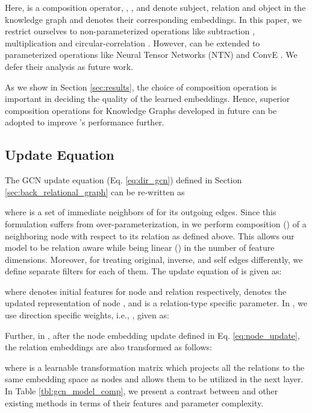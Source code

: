 \documentclass{article} \usepackage{iclr2020_conference,times}
\begin{document}
Here,  is a composition operator, , , and  denote subject, relation and object in the knowledge graph and  denotes their corresponding embeddings. In this paper, we restrict ourselves to non-parameterized operations like subtraction \citep{transe}, multiplication \citep{distmult} and circular-correlation \citep{hole}. However, \method{} can be extended to parameterized operations like Neural Tensor Networks (NTN) \citep{ntn_kg} and ConvE \citep{conve}. We defer their analysis as future work.

As we show in Section \ref{sec:results}, the choice of composition operation is important in deciding the quality of the learned embeddings. Hence, superior composition operations for Knowledge Graphs developed in future can be adopted to improve \method's performance further.

\subsection{\method{} Update Equation}

The GCN update equation (Eq. \ref{eq:dir_gcn}) defined in Section \ref{sec:back_relational_graph} can be re-written as

where  is a set of immediate neighbors of  for its outgoing edges. Since this formulation suffers from over-parameterization, in \method{} we perform composition () of a neighboring node  with respect to its relation  as defined above. This allows our model to be relation aware while being linear () in the number of feature dimensions. Moreover, for treating original, inverse, and self edges differently, we define separate filters for each of them. The update equation of \method{} is given as:

where  denotes initial features for node  and relation  respectively,  denotes the updated representation of node , and  is a relation-type specific parameter.  In \method{}, we use direction specific weights, i.e., , given as:


Further, in \method{}, after the node embedding update defined in Eq. \ref{eq:node_update}, the relation embeddings are also transformed as follows:

where  is a learnable transformation matrix which projects all the relations to the same embedding space as nodes and allows them to be utilized in the next \method{} layer. In Table \ref{tbl:gcn_model_comp}, we present a contrast between \method{} and other existing methods in terms of their features and parameter complexity. 
\end{document}
